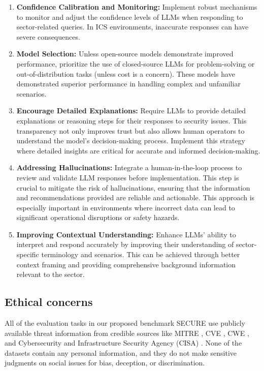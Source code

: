 \documentclass[conference]{IEEEtran}
\begin{document}
\begin{enumerate}[leftmargin=*, noitemsep, topsep=0pt, partopsep=0pt]
\item \textbf{Confidence Calibration and Monitoring:} Implement robust mechanisms to monitor and adjust the confidence levels of LLMs when responding to sector-related queries. In ICS environments, inaccurate responses can have severe consequences. %

\item \textbf{Model Selection:} Unless open-source models demonstrate improved performance, prioritize the use of closed-source LLMs for problem-solving or out-of-distribution tasks (unless cost is a concern). These models have demonstrated superior performance in handling complex and unfamiliar scenarios.

\item \textbf{Encourage Detailed Explanations:} Require LLMs to provide detailed explanations or reasoning steps for their responses to security issues. This transparency not only improves trust but also allows human operators to understand the model's decision-making process. Implement this strategy where detailed insights are critical for accurate and informed decision-making.

\item \textbf{Addressing Hallucinations:} Integrate a human-in-the-loop process to review and validate LLM responses before implementation. This step is crucial to mitigate the risk of hallucinations, ensuring that the information and recommendations provided are reliable and actionable. This approach is especially important in environments where incorrect data can lead to significant operational disruptions or safety hazards.

\item \textbf{Improving Contextual Understanding:} Enhance LLMs' ability to interpret and respond accurately by improving their understanding of sector-specific terminology and scenarios. This can be achieved through better context framing and providing comprehensive background information relevant to the sector.
\end{enumerate}


\subsection{Ethical concerns}
All of the evaluation tasks in our proposed benchmark SECURE use publicly available threat information from credible sources like MITRE \cite{mitre-techniques} \cite{mitre-mitigations}, CVE \cite{cve2024}, CWE \cite{cwe1358}, and Cybersecurity and Infrastructure Security Agency (CISA) \cite{cisa_advisories}. None of the datasets contain any personal information, and they do not make sensitive judgments on social issues for bias, deception, or discrimination. 
\end{document}
